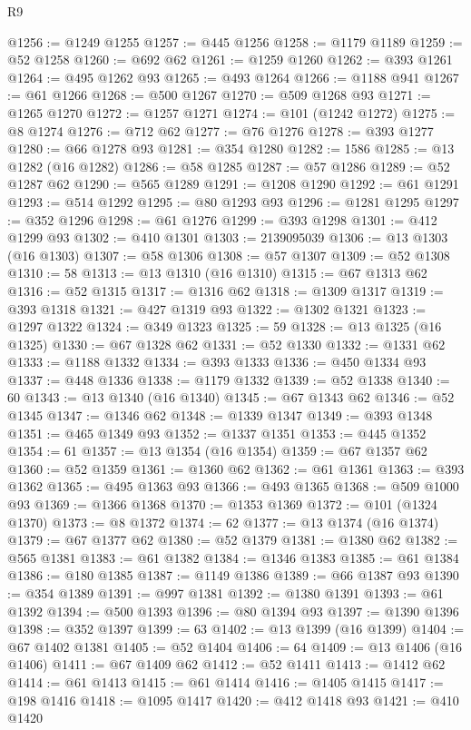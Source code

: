 \begin{lexlean}{R9}
\begin{coremodule}
@1256 := @1249 @1255
@1257 := @445 @1256
@1258 := @1179 @1189
@1259 := @52 @1258
@1260 := @692 @62
@1261 := @1259 @1260
@1262 := @393 @1261
@1264 := @495 @1262 @93
@1265 := @493 @1264
@1266 := @1188 @941
@1267 := @61 @1266
@1268 := @500 @1267
@1270 := @509 @1268 @93
@1271 := @1265 @1270
@1272 := @1257 @1271
@1274 := @101 (@1242 @1272)
@1275 := @8 @1274
@1276 := @712 @62
@1277 := @76 @1276
@1278 := @393 @1277
@1280 := @66 @1278 @93
@1281 := @354 @1280
@1282 := 1586
@1285 := @13 @1282 (@16 @1282)
@1286 := @58 @1285
@1287 := @57 @1286
@1289 := @52 @1287 @62
@1290 := @565 @1289
@1291 := @1208 @1290
@1292 := @61 @1291
@1293 := @514 @1292
@1295 := @80 @1293 @93
@1296 := @1281 @1295
@1297 := @352 @1296
@1298 := @61 @1276
@1299 := @393 @1298
@1301 := @412 @1299 @93
@1302 := @410 @1301
@1303 := 2139095039
@1306 := @13 @1303 (@16 @1303)
@1307 := @58 @1306
@1308 := @57 @1307
@1309 := @52 @1308
@1310 := 58
@1313 := @13 @1310 (@16 @1310)
@1315 := @67 @1313 @62
@1316 := @52 @1315
@1317 := @1316 @62
@1318 := @1309 @1317
@1319 := @393 @1318
@1321 := @427 @1319 @93
@1322 := @1302 @1321
@1323 := @1297 @1322
@1324 := @349 @1323
@1325 := 59
@1328 := @13 @1325 (@16 @1325)
@1330 := @67 @1328 @62
@1331 := @52 @1330
@1332 := @1331 @62
@1333 := @1188 @1332
@1334 := @393 @1333
@1336 := @450 @1334 @93
@1337 := @448 @1336
@1338 := @1179 @1332
@1339 := @52 @1338
@1340 := 60
@1343 := @13 @1340 (@16 @1340)
@1345 := @67 @1343 @62
@1346 := @52 @1345
@1347 := @1346 @62
@1348 := @1339 @1347
@1349 := @393 @1348
@1351 := @465 @1349 @93
@1352 := @1337 @1351
@1353 := @445 @1352
@1354 := 61
@1357 := @13 @1354 (@16 @1354)
@1359 := @67 @1357 @62
@1360 := @52 @1359
@1361 := @1360 @62
@1362 := @61 @1361
@1363 := @393 @1362
@1365 := @495 @1363 @93
@1366 := @493 @1365
@1368 := @509 @1000 @93
@1369 := @1366 @1368
@1370 := @1353 @1369
@1372 := @101 (@1324 @1370)
@1373 := @8 @1372
@1374 := 62
@1377 := @13 @1374 (@16 @1374)
@1379 := @67 @1377 @62
@1380 := @52 @1379
@1381 := @1380 @62
@1382 := @565 @1381
@1383 := @61 @1382
@1384 := @1346 @1383
@1385 := @61 @1384
@1386 := @180 @1385
@1387 := @1149 @1386
@1389 := @66 @1387 @93
@1390 := @354 @1389
@1391 := @997 @1381
@1392 := @1380 @1391
@1393 := @61 @1392
@1394 := @500 @1393
@1396 := @80 @1394 @93
@1397 := @1390 @1396
@1398 := @352 @1397
@1399 := 63
@1402 := @13 @1399 (@16 @1399)
@1404 := @67 @1402 @1381
@1405 := @52 @1404
@1406 := 64
@1409 := @13 @1406 (@16 @1406)
@1411 := @67 @1409 @62
@1412 := @52 @1411
@1413 := @1412 @62
@1414 := @61 @1413
@1415 := @61 @1414
@1416 := @1405 @1415
@1417 := @198 @1416
@1418 := @1095 @1417
@1420 := @412 @1418 @93
@1421 := @410 @1420

\end{coremodule}
\end{lexlean}

